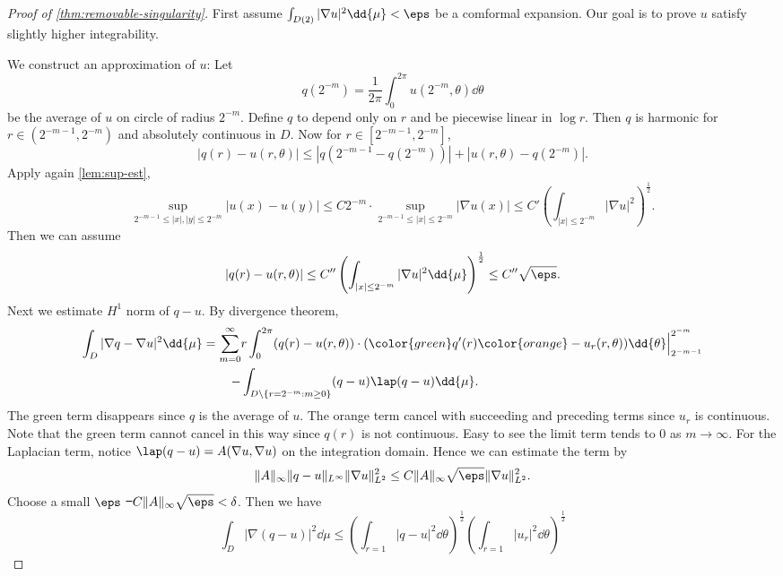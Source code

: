 \documentclass[UTF8,12pt]{article}
\theoremstyle{plain}\newtheorem{theorem}{Theorem}
\theoremstyle{definition}\newtheorem{definition}[theorem]{Definition}
\theoremstyle{definition}\newtheorem{example}[theorem]{Example}
\theoremstyle{plain}\newtheorem{axiom}[theorem]{Axiom}
\theoremstyle{plain}\newtheorem{assertion}[theorem]{Assertion}
\theoremstyle{plain}\newtheorem{corollary}[theorem]{Corollary}
\theoremstyle{plain}\newtheorem{lemma}[theorem]{Lemma}
\theoremstyle{plain}\newtheorem{proposition}[theorem]{Proposition}
\theoremstyle{plain}\newtheorem{prop}[theorem]{Proposition}
\theoremstyle{plain}\newtheorem{conjecture}[theorem]{Conjecture}
\theoremstyle{plain}\newtheorem{conj}[theorem]{Conjecture}
\theoremstyle{plain}\newtheorem{problem}[theorem]{Problem}
\theoremstyle{remark}\newtheorem{notation}[theorem]{Notation}
\theoremstyle{definition}\newtheorem*{question}{Question}
\theoremstyle{definition}\newtheorem*{answer}{Answer}
\theoremstyle{definition}\newtheorem*{goal}{Goal}
\theoremstyle{plain}\newtheorem*{application}{Application}
\theoremstyle{plain}\newtheorem*{exercise}{Exercise}
\theoremstyle{remark}\newtheorem*{remark}{Remark}
\theoremstyle{remark}\newtheorem*{note}{\small{Note}}
\numberwithin{equation}{section}
\numberwithin{theorem}{section}
\numberwithin{figure}{section}
\begin{document}
\begin{proof}[Proof of \cref{thm:removable-singularity}]
    First assume \(\int_{D(2)}|\nabla u|^2\dd{\mu}<\eps\) be a comformal expansion.
    Our goal is to prove \(u\) satisfy slightly higher integrability.

    We construct an approximation of \(u\): Let \[
        q(2^{-m})=\frac{1}{2\pi}\int_{0}^{2\pi}u(2^{-m},\theta)\dd{\theta}
    \] be the average of \(u\) on circle of radius \(2^{-m}\). Define \(q\) to depend
    only on \(r\) and be piecewise linear in \(\log r\). Then \(q\) is harmonic
    for \(r\in (2^{-m-1},2^{-m})\) and absolutely continuous in \(D\).
    Now for \(r\in [2^{-m-1},2^{-m}]\), \[
        |q(r)-u(r,\theta)|\le |q(2^{-m-1}-q(2^{-m}))|+|u(r,\theta)-q(2^{-m})|
    .\] Apply again \cref{lem:sup-est}, \[
        \sup_{2^{-m-1}\le |x|,|y|\le 2^{-m}}|u(x)-u(y)|
        \le C 2^{-m}\cdot\sup_{2^{-m-1}\le |x|\le 2^{-m}}|\nabla u(x)|
        \le C'\left(\int_{|x|\le 2^{-m}}|\nabla u|^2\right)^{\frac{1}{2}}
    .\] Then we can assume \[
        |q(r)-u(r,\theta)|
        \le C''\left(\int_{|x|\le 2^{-m}}|\nabla u|^2\dd{\mu}\right)^{\frac{1}{2}}
        \le C''\sqrt{\eps}
    .\] Next we estimate \(H^1\) norm of \(q-u\). By divergence theorem,
    \begin{align*}
        \int_{D}|\nabla q-\nabla u|^2\dd{\mu}
        =\sum_{m=0}^\infty & r \int_{0}^{2\pi}(q(r)-u(r,\theta))\cdot
        ({\color{green}q'(r)\color{orange}-u_r(r,\theta)})
        \dd{\theta}\Big|_{2^{-m-1}}^{2^{-m}} \\
        -& \int_{D\setminus\{r=2^{-m}:m\ge 0\}} (q-u)\lap (q-u)\dd{\mu}
    .\end{align*} The green term disappears since \(q\) is the average of \(u\). The
    orange term cancel with succeeding and preceding terms since \(u_r\) is continuous.
    Note that the green term cannot cancel in this way since \(q(r)\) is not
    continuous. Easy to see the limit term tends to 0 as \(m\to \infty\).
    For the Laplacian term, notice \(\lap (q-u)=A(\nabla u,\nabla u)\) on the
    integration domain. Hence we can estimate the term by \[
        \|A\|_{\infty}\|q-u\|_{L^\infty}\|\nabla u\|_{L^2}^2
        \le C\|A\|_{\infty}\sqrt{\eps}\|\nabla u\|_{L^2}^2
    .\] Choose a small \(\eps\) \st\ \(C\|A\|_{\infty}\sqrt{\eps}<\delta\). Then
    we have
    \begin{equation}\label{eq:q-u-H1}
        \int_{D}|\nabla (q-u)|^2\dd{\mu}
        \le \left(\int_{r=1}|q-u|^2\dd{\theta}\right)^{\frac{1}{2}}
        \left(\int_{r=1}|u_r|^2\dd{\theta}\right)^{\frac{1}{2}}

\end{equation}
\end{proof}
\end{document}
